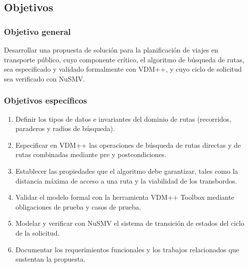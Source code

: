 \subsection{Objetivos}
\label{sec:objetivos}

\subsubsection{Objetivo general}

Desarrollar una propuesta de solución para la planificación de viajes en transporte público, cuyo componente crítico, el algoritmo de búsqueda de rutas, sea especificado y validado formalmente con VDM++, y cuyo ciclo de solicitud sea verificado con NuSMV.

\subsubsection{Objetivos específicos}

\begin{enumerate}
    \item Definir los tipos de datos e invariantes del dominio de rutas (recorridos, paraderos y radios de búsqueda).
    \item Especificar en VDM++ las operaciones de búsqueda de rutas directas y de rutas combinadas mediante pre y postcondiciones.
    \item Establecer las propiedades que el algoritmo debe garantizar, tales como la distancia máxima de acceso a una ruta y la viabilidad de los transbordos.
    \item Validar el modelo formal con la herramienta VDM++ Toolbox mediante obligaciones de prueba y casos de prueba.
    \item Modelar y verificar con NuSMV el sistema de transición de estados del ciclo de la solicitud.
    \item Documentar los requerimientos funcionales y los trabajos relacionados que sustentan la propuesta.
\end{enumerate}
